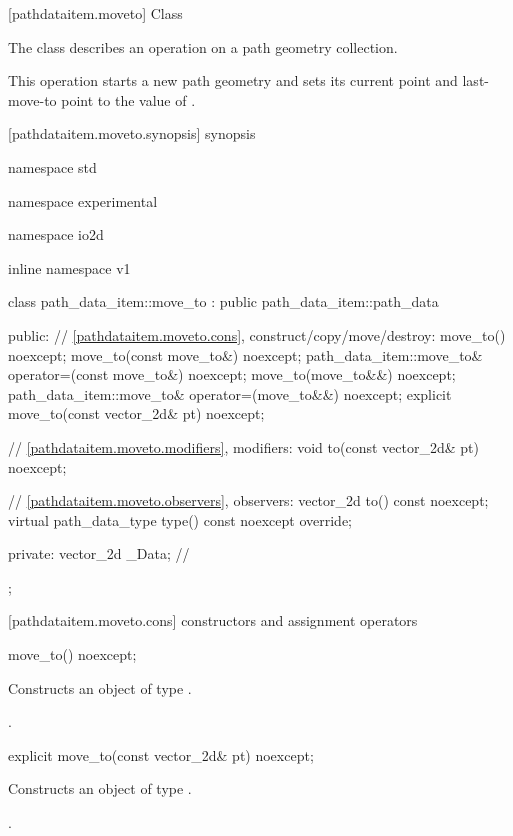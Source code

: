  [pathdataitem.moveto] {Class }

\pnum
{}
The class  describes an operation on a path geometry collection.

\pnum
This operation starts a new path geometry and sets its current point and last-move-to point to the value of .

 [pathdataitem.moveto.synopsis] { synopsis}

\begin{codeblock}
namespace std { namespace experimental { namespace io2d { inline namespace v1 {
  class path_data_item::move_to : public path_data_item::path_data {
  public:
    // \ref{pathdataitem.moveto.cons}, construct/copy/move/destroy:
    move_to() noexcept;
    move_to(const move_to&) noexcept;
    path_data_item::move_to& operator=(const move_to&) noexcept;
    move_to(move_to&&) noexcept;
    path_data_item::move_to& operator=(move_to&&) noexcept;
    explicit move_to(const vector_2d& pt) noexcept;

    // \ref{pathdataitem.moveto.modifiers}, modifiers:
    void to(const vector_2d& pt) noexcept;

    // \ref{pathdataitem.moveto.observers}, observers:
    vector_2d to() const noexcept;
    virtual path_data_type type() const noexcept override;
    
  private:
    vector_2d _Data; // \expos
  };
} } } }
\end{codeblock}

 [pathdataitem.moveto.cons] { constructors and assignment operators}

\begin{itemdecl}
    move_to() noexcept;
\end{itemdecl}
\begin{itemdescr}
	\pnum
	\effects
	Constructs an object of type .
	
	\pnum
	\postconditions
	.
\end{itemdescr}

\begin{itemdecl}
    explicit move_to(const vector_2d& pt) noexcept;
\end{itemdecl}
\begin{itemdescr}
	\pnum
	\effects
	Constructs an object of type .
	
	\pnum
	\postconditions
	.
\end{itemdescr}

